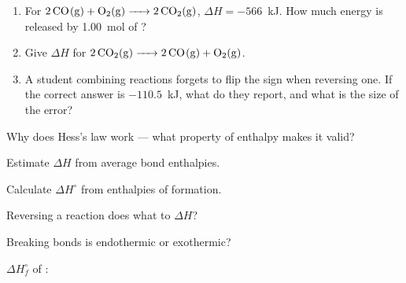 \documentclass{apchem-notes}
\begin{document}

\begin{enumerate}[leftmargin=*,itemsep=0.4em]
  \item For $\ce{2CO(g) + O2(g) -> 2CO2(g)}$,
        $\Delta H = -566$~kJ. How much energy is released by
        \SI{1.00}{\mole} of ? 
  \item Give $\Delta H$ for $\ce{2CO2(g) -> 2CO(g) + O2(g)}$.
  \item A student combining reactions forgets to flip the sign when
        reversing one. If the correct answer is $-110.5$~kJ, what do they
        report, and what is the size of the error?
\end{enumerate}

\begin{exitticket}
Why does Hess's law work --- what property of enthalpy makes it valid?
\end{exitticket}


\begin{objectives}
  \item Estimate $\Delta H$ from average bond enthalpies.
  \item Calculate $\Delta H^\circ$ from enthalpies of formation.
\end{objectives}

 

\begin{warmup}[3]
  \item Reversing a reaction does what to $\Delta H$?
  \item Breaking bonds is endothermic or exothermic?
  \item $\Delta H_f^\circ$ of : 
\end{warmup}
\end{document}
